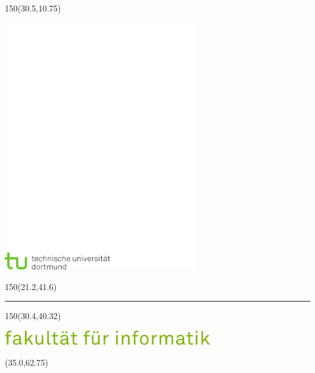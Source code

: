 
\begin{titlepage}

\begin{textblock}{150}(30.5,10.75)%
\raggedright
\includegraphics[width=83.25mm]{images/tud_logo_cmyk.pdf}%
\end{textblock}

\begin{textblock}{150}(21.2,41.6)%
\raggedright\sffamily%
{\color{red}\rule{5mm}{5mm}}
\end{textblock}

\begin{textblock}{150}(30.4,40.32)%
\raggedright
\includegraphics[width=90mm]{images/fi_text.pdf}
\end{textblock}

\begin{textblock}{89}(35.0,62.75)%
\begin{minipage}{80mm}
	\vfill
	\begin{center}
	\fontsize{24pt}{24pt} \sffamily
	\Thesistyp
	
	\vspace{1cm}
	\begin{onehalfspace}
    \fontsize{18pt}{18pt}
    \sffamily \Thesistitle
    \end{onehalfspace}
	
	\vspace{12mm}
\begin{onehalfspace}
	{\fontsize{14pt}{14pt}\sffamily \Author

}
\end{onehalfspace}
\end{center}
\end{minipage}
\end{textblock}
\end{titlepage}
